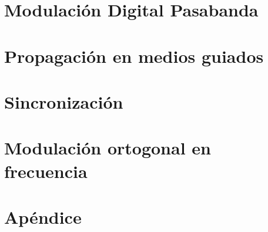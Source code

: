 \documentclass[a4paper,11pt]{report}
\theoremstyle{definition}
\begin{document}
\chapter{Modulación Digital Pasabanda}\label{chapter:modulacion pasabanda}


\chapter{Propagación en medios guiados}\label{chapter:propagacion guiada}


\chapter{Sincronización}\label{chapter:sincronizacion}


\chapter{Modulación ortogonal en frecuencia}\label{chapter:ofdm}


\appendix

\chapter{Apéndice}








\end{document}
